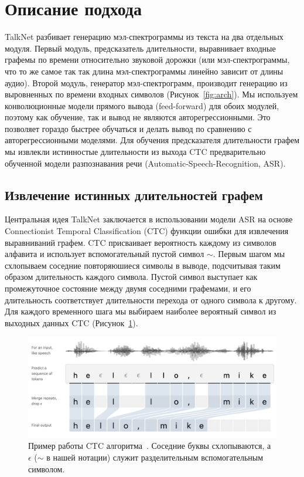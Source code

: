 \section{Описание подхода}

TalkNet разбивает генерацию мэл-спектрограммы из текста на два отдельных модуля. Первый модуль, предсказатель длительности, выравнивает входные графемы по времени относительно звуковой дорожки (или мэл-спектрограммы, что то же самое так так длина мэл-спектрограммы линейно зависит от длины аудио). Второй модуль, генератор мэл-спектрограмм, производит генерацию из выровненных по времени входных символов (Рисунок~\ref{fig:arch}). Мы используем конволюционные модели прямого вывода (feed-forward) для обоих модулей, поэтому как обучение, так и вывод не являются авторегрессионными. Это позволяет гораздо быстрее обучаться и делать вывод по сравнению с авторегрессионными моделями. Для обучения предсказателя длительности графем мы извлекли истинностые длительности из выхода CTC предварительно обученной модели разпознавания речи (Automatic-Speech-Recognition, ASR).

\subsection{Извлечение истинных длительностей графем}

Центральная идея TalkNet заключается в использовании модели ASR на основе Connectionist Temporal Classification (CTC) функции ошибки для извлечения выравниваний графем. CTC присваивает вероятность каждому из символов алфавита и использует вспомогательный пустой символ $\sim$. Первым шагом мы схлопываем соседние повторяюшиеся символы в выводе, подсчитывая таким образом длительность каждого символа. Пустой символ выступает как промежуточное состояние между двумя соседними графемами, и его длительность соответствует длительности перехода от одного символа к другому. Для каждого временного шага мы выбираем наиболее вероятный символ из выходных данных CTC (Рисунок~\ref{fig:ctc}).

\begin{figure}[!ht]
\centering
\includegraphics[width=1.0\textwidth]{images/snippets/ctc.png}
\caption{Пример работы CTC алгоритма~\cite{hannun2017sequence}. Соседние буквы схлопываются, а $\epsilon$ ($\sim$ в нашей нотации) служит разделительным вспомогательным символом.}
\label{fig:ctc}
\end{figure}

